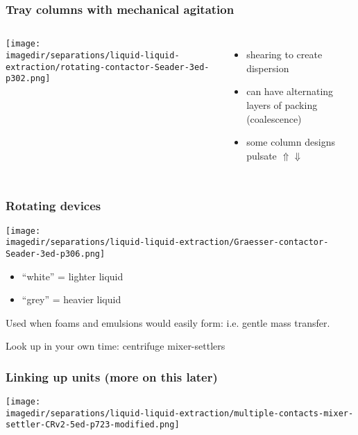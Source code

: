 \begin{frame}\frametitle{Tray columns with mechanical agitation}
	\begin{columns}[t]
			\begin{center}
				\texttt{[image: \\imagedir/separations/liquid-liquid-extraction/rotating-contactor-Seader-3ed-p302.png]}
			\end{center}
			
			\begin{itemize}
				\item	shearing to create dispersion
				\item	can have alternating layers of packing (coalescence)
				\item	some column designs pulsate $\Uparrow \Downarrow$
			\end{itemize}
	\end{columns}
\end{frame}



\begin{frame}\frametitle{Rotating devices}
	\begin{center}
		\texttt{[image: \\imagedir/separations/liquid-liquid-extraction/Graesser-contactor-Seader-3ed-p306.png]}
	\end{center}
	\vspace{-12pt}
	\begin{itemize}
		\item	``white'' = lighter liquid
		\item	``grey'' = heavier liquid
	\end{itemize}
	Used when foams and emulsions would easily form: i.e. gentle mass transfer.
	
	\vspace{12pt}
	{\color{myOrange}Look up in your own time: centrifuge mixer-settlers}
\end{frame}

\begin{frame}\frametitle{Linking up units (more on this later)}
	\begin{center}
		\texttt{[image: \\imagedir/separations/liquid-liquid-extraction/multiple-contacts-mixer-settler-CRv2-5ed-p723-modified.png]}
	\end{center}
\end{frame}

